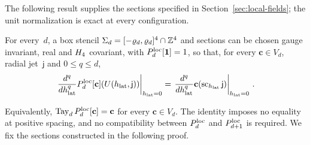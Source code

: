 The following result supplies the sections specified in Section~\ref{sec:local-fields}; the unit normalization is exact at every configuration.
\begin{lemma}\label{lem:A1}
For every~$d$, a box stencil $\Sigma_d=[-\varrho_d,\varrho_d]^4\cap\mathbb{Z}^4$ and sections can be chosen gauge invariant, real and $H_4$ covariant, with $P_{d}^{\mathrm{loc}}[\mathbf1]=1$, so that, for every $\mathbf c\in V_d$, radial jet~$\mathsf j$ and $0\le q\le d$,
\begin{equation}\label{eq:A-Taylor}
\left.\frac{d^q}{dh_{\rm lat}^q}P_{d}^{\mathrm{loc}}[\mathbf c](U(h_{\rm lat},\mathsf j))\right|_{h_{\rm lat}=0}
=\left.\frac{d^q}{dh_{\rm lat}^q}\mathbf c(\operatorname{sc}_{h_{\rm lat}}\mathsf j)\right|_{h_{\rm lat}=0}\,.
\end{equation}
\end{lemma}
Equivalently, $\operatorname{Tay}_{d}P_{d}^{\mathrm{loc}}[\mathbf c]=\mathbf c$ for every $\mathbf c\in V_d$. The identity imposes no equality at positive spacing, and no compatibility between $P_{d}^{\mathrm{loc}}$ and $P_{d+1}^{\mathrm{loc}}$ is required. We fix the sections constructed in the following proof.

